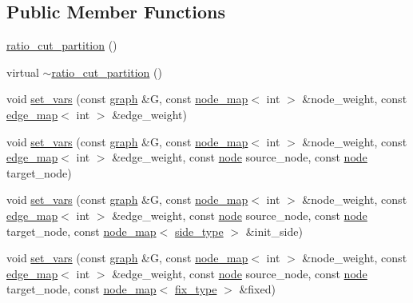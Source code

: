 \subsection*{Public Member Functions}
\begin{DoxyCompactItemize}
\item 
\mbox{\hyperlink{classratio__cut__partition_a56e283d4ec5a06115146982e86c65878}{ratio\+\_\+cut\+\_\+partition}} ()
\item 
virtual \mbox{\hyperlink{classratio__cut__partition_a5fe4f3a926fd07a1af46cce9acdbb849}{$\sim$ratio\+\_\+cut\+\_\+partition}} ()
\item 
void \mbox{\hyperlink{classratio__cut__partition_a4c143f82aac5fee3b955414ab7d6ce19}{set\+\_\+vars}} (const \mbox{\hyperlink{classgraph}{graph}} \&G, const \mbox{\hyperlink{classnode__map}{node\+\_\+map}}$<$ int $>$ \&node\+\_\+weight, const \mbox{\hyperlink{classedge__map}{edge\+\_\+map}}$<$ int $>$ \&edge\+\_\+weight)
\item 
void \mbox{\hyperlink{classratio__cut__partition_aacd519cdb1760af792e22d57e746c07f}{set\+\_\+vars}} (const \mbox{\hyperlink{classgraph}{graph}} \&G, const \mbox{\hyperlink{classnode__map}{node\+\_\+map}}$<$ int $>$ \&node\+\_\+weight, const \mbox{\hyperlink{classedge__map}{edge\+\_\+map}}$<$ int $>$ \&edge\+\_\+weight, const \mbox{\hyperlink{classnode}{node}} source\+\_\+node, const \mbox{\hyperlink{classnode}{node}} target\+\_\+node)
\item 
void \mbox{\hyperlink{classratio__cut__partition_a67ea2ccb8b5cce2e4acd8e10e112a962}{set\+\_\+vars}} (const \mbox{\hyperlink{classgraph}{graph}} \&G, const \mbox{\hyperlink{classnode__map}{node\+\_\+map}}$<$ int $>$ \&node\+\_\+weight, const \mbox{\hyperlink{classedge__map}{edge\+\_\+map}}$<$ int $>$ \&edge\+\_\+weight, const \mbox{\hyperlink{classnode}{node}} source\+\_\+node, const \mbox{\hyperlink{classnode}{node}} target\+\_\+node, const \mbox{\hyperlink{classnode__map}{node\+\_\+map}}$<$ \mbox{\hyperlink{classratio__cut__partition_ace53442bd0c1e21fbf00858ec6f6b456}{side\+\_\+type}} $>$ \&init\+\_\+side)
\item 
void \mbox{\hyperlink{classratio__cut__partition_a2c09504b727a1b1d1e2f99a3a42de05b}{set\+\_\+vars}} (const \mbox{\hyperlink{classgraph}{graph}} \&G, const \mbox{\hyperlink{classnode__map}{node\+\_\+map}}$<$ int $>$ \&node\+\_\+weight, const \mbox{\hyperlink{classedge__map}{edge\+\_\+map}}$<$ int $>$ \&edge\+\_\+weight, const \mbox{\hyperlink{classnode}{node}} source\+\_\+node, const \mbox{\hyperlink{classnode}{node}} target\+\_\+node, const \mbox{\hyperlink{classnode__map}{node\+\_\+map}}$<$ \mbox{\hyperlink{classratio__cut__partition_a558dda40abda8ab03edb4605dbb81e36}{fix\+\_\+type}} $>$ \&fixed)

\end{DoxyCompactItemize}
